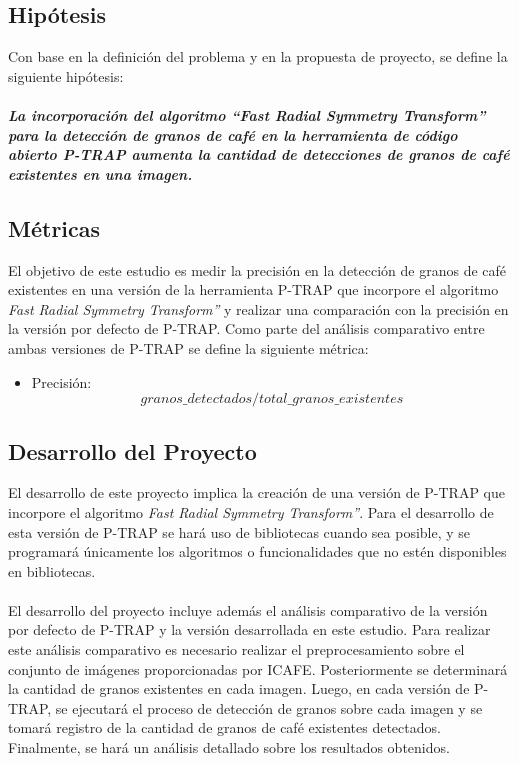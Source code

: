 \subsection{Hip\'otesis}
Con base en la definici\'on del problema y en la propuesta de proyecto, se define la siguiente hip\'otesis:\\\\
\textbf{\textit{La incorporaci\'on del algoritmo “Fast Radial Symmetry Transform”\cite{loyzelinsky} para la detecci\'on de granos de caf\'e en la herramienta de c\'odigo abierto P-TRAP\cite{ptrap} aumenta la cantidad de detecciones de granos de caf\'e existentes en una imagen.}} 
\subsection{M\'etricas} \label{metricas}
El objetivo de este estudio es medir la precisi\'on en la detecci\'on de granos de caf\'e existentes en una versi\'on de la herramienta P-TRAP\cite{ptrap} que incorpore el algoritmo \textit{Fast Radial Symmetry Transform”}\cite{loyzelinsky} y realizar una comparaci\'on con la precisi\'on en la versi\'on por defecto de P-TRAP\cite{ptrap}. Como parte del an\'alisis comparativo entre ambas versiones de P-TRAP\cite{ptrap} se define la siguiente m\'etrica:
\begin{itemize}
\item Precisi\'on: \[ granos\_detectados / total\_granos\_existentes \]
\end{itemize}
\subsection{Desarrollo del Proyecto}
El desarrollo de este proyecto implica la creaci\'on de una versi\'on de P-TRAP\cite{ptrap} que incorpore el algoritmo \textit{Fast Radial Symmetry Transform”}\cite{loyzelinsky}. Para el desarrollo de esta versi\'on de P-TRAP\cite{ptrap} se har\'a uso de bibliotecas cuando sea posible, y se programar\'a \'unicamente los algoritmos o funcionalidades que no est\'en disponibles en bibliotecas.
\\\\
El desarrollo del proyecto incluye adem\'as el an\'alisis comparativo de la versi\'on por defecto de P-TRAP\cite{ptrap} y la versi\'on desarrollada en este estudio. Para realizar este an\'alisis comparativo es necesario realizar el preprocesamiento sobre el conjunto de im\'agenes proporcionadas por ICAFE. Posteriormente se determinar\'a la cantidad de granos existentes en cada imagen. Luego, en cada versi\'on de P-TRAP\cite{ptrap}, se ejecutar\'a el proceso de detecci\'on de granos sobre cada imagen y se tomar\'a registro de la cantidad de granos de caf\'e existentes detectados. Finalmente, se har\'a un an\'alisis detallado sobre los resultados obtenidos.